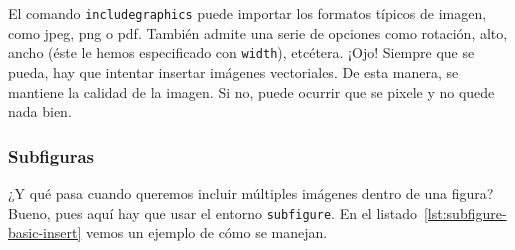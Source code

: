 \documentclass[%
    school=etsisi,%
    degree=61TI,%
]{upm-report}
\begin{document}
El comando \texttt{includegraphics} puede importar los formatos típicos de imagen, como jpeg, png o pdf. También admite una serie de opciones como rotación, alto, ancho (éste le hemos especificado con \texttt{width}), etcétera. ¡Ojo! Siempre que se pueda, hay que intentar insertar imágenes vectoriales. De esta manera, se mantiene la calidad de la imagen. Si no, puede ocurrir que se pixele y no quede nada bien.

\subsubsection{Subfiguras}

¿Y qué pasa cuando queremos incluir múltiples imágenes dentro de una figura? Bueno, pues aquí hay que usar el entorno \texttt{subfigure}. En el listado~\ref{lst:subfigure-basic-insert} vemos un ejemplo de cómo se manejan.
\end{document}

